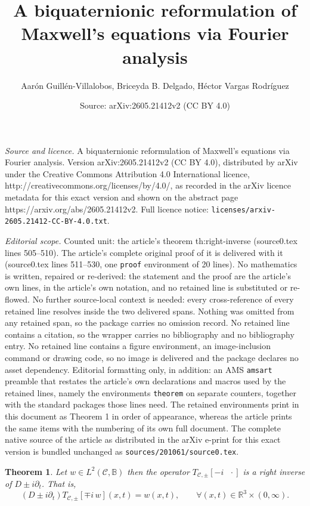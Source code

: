 \documentclass[10pt,a4paper]{amsart}
\title{A biquaternionic reformulation of Maxwell's equations via Fourier analysis}
\author{Aar\'on Guill\'en-Villalobos, Briceyda B. Delgado, H\'ector Vargas Rodr\'iguez}
\date{Source: arXiv:2605.21412v2 (CC BY 4.0)}
\newtheorem{theorem}{Theorem}
\def\B{\mathbb{B}}
\def\R{\mathbb{R}}
\begin{document}
\maketitle

\noindent\emph{Source and licence.} A biquaternionic reformulation of Maxwell's equations via Fourier analysis. Version arXiv:2605.21412v2 (CC BY 4.0), distributed by arXiv under the Creative Commons Attribution 4.0 International licence, http://creativecommons.org/licenses/by/4.0/, as recorded in the arXiv licence metadata for this exact version and shown on the abstract page https://arxiv.org/abs/2605.21412v2. Full licence notice: \texttt{licenses/arxiv-2605.21412-CC-BY-4.0.txt}.\par\smallskip

\noindent\textit{Editorial scope.} Counted unit: the article's theorem th:right-inverse (source0.tex lines 505--510). The article's complete original proof of it is delivered with it (source0.tex lines 511--530, one \texttt{proof} environment of 20 lines). No mathematics is written, repaired or re-derived: the statement and the proof are the article's own lines, in the article's own notation, and no retained line is substituted or re-flowed.  No further source-local context is needed: every cross-reference of every retained line resolves inside the two delivered spans.  Nothing was omitted from any retained span, so the package carries no omission record.  No retained line contains a citation, so the wrapper carries no bibliography and no bibliography entry.  No retained line contains a figure environment, an image-inclusion command or drawing code, so no image is delivered and the package declares no asset dependency.  Editorial formatting only, in addition: an AMS \texttt{amsart} preamble that restates the article's own declarations and macros used by the retained lines, namely the environments \texttt{theorem} on separate counters, together with the standard packages those lines need.  The retained environments print in this document as Theorem 1 in order of appearance, whereas the article prints the same items with the numbering of its own full document.  The complete native source of the article as distributed in the arXiv e-print for this exact version is bundled unchanged as \texttt{sources/201061/source0.tex}.
\begin{theorem}\label{th:right-inverse}
    Let $w\in L^2(\mathscr{C},\B)$ then the operator $T_{\mathscr{C},\pm}[-i\text{ } \cdot]$ is a right inverse of $D\pm i\partial_t$. That is,
    \begin{equation}\label{eq:inverse-parabolic}
        (D\pm i\partial_t) T_{\mathscr{C},\pm}[\mp i \,w](x,t)= w(x,t), \qquad\forall (x,t)\in\R^3\times (0,\infty).
    \end{equation}
\end{theorem}
\end{document}
